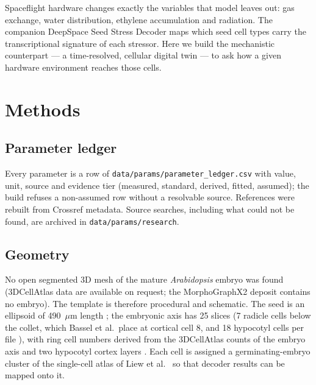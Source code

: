 \documentclass[11pt]{article}
\begin{document}
Spaceflight hardware changes exactly the variables that model leaves out: gas exchange, water distribution, ethylene accumulation and
radiation. The companion DeepSpace Seed Stress Decoder maps which seed cell types carry the transcriptional signature of each
stressor. Here we build the mechanistic counterpart --- a time-resolved, cellular digital twin --- to ask how a given hardware
environment reaches those cells.

\section{Methods}
\subsection{Parameter ledger}
Every parameter is a row of \texttt{data/params/parameter\_ledger.csv} with value, unit, source and evidence tier
(measured, standard, derived, fitted, assumed); the build refuses a non-assumed row without a resolvable source. References were
rebuilt from Crossref metadata. Source searches, including what could not be found, are archived in \texttt{data/params/research}.

\subsection{Geometry}
No open segmented 3D mesh of the mature \emph{Arabidopsis} embryo was found (3DCellAtlas data are available on request; the
MorphoGraphX2 deposit contains no embryo). The template is therefore procedural and schematic. The seed is an ellipsoid of
490~$\mu$m length \citep{klasen2025}; the embryonic axis has 25 slices (7 radicle cells below the collet, which Bassel et al.\ place
at cortical cell 8, and 18 hypocotyl cells per file \citep{boudaher2018}), with ring cell numbers derived from the 3DCellAtlas
counts of the embryo axis \citep{montenegrojohnson2015} and two hypocotyl cortex layers \citep{jackson2017}. Each cell is assigned a
germinating-embryo cluster of the single-cell atlas of Liew et al.~\citep{liew2024} so that decoder results can be mapped onto it.
\end{document}
